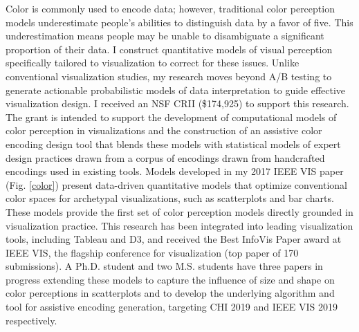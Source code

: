 \documentclass[11pt]{article}
\begin{document}
Color is commonly used to encode data; however, traditional color perception models underestimate people's abilities to distinguish data by a favor of five. This underestimation means people may be unable to disambiguate a significant proportion of their data. I construct quantitative models of visual perception specifically tailored to visualization to correct for these issues. Unlike conventional visualization studies, my research moves beyond A/B testing to generate actionable probabilistic models of data interpretation to guide effective visualization design. I received an NSF CRII (\$174,925) to support this research. The grant is intended to support the development of computational models of color perception in visualizations and the construction of an assistive color encoding design tool that blends these models with statistical models of expert design practices drawn from a corpus of encodings drawn from handcrafted encodings used in existing tools.
Models developed in my 2017 IEEE VIS paper \cite{szafir2018Modeling} (Fig. \ref{color}) present data-driven quantitative models that optimize conventional color spaces for archetypal visualizations, such as scatterplots and bar charts. These models provide the first set of color perception models directly grounded in visualization practice. This research has been integrated into leading visualization tools, including Tableau and D3, and received the Best InfoVis Paper award at IEEE VIS, the flagship conference for visualization (top paper of 170 submissions). A Ph.D. student and two M.S. students have three papers in progress extending these models to capture the influence of size and shape on color perceptions in scatterplots and to develop the underlying algorithm and tool for assistive encoding generation, targeting CHI 2019 and IEEE VIS 2019 respectively. 
\end{document}
